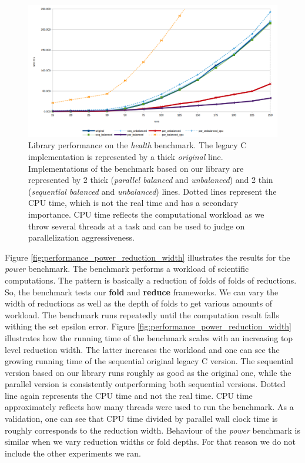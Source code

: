\begin{figure}[!htb]
\includegraphics[width=1.0\textwidth]{images/health_depth_10.png}
\caption{Library performance on the \textit{health} benchmark. The legacy C implementation is represented by a thick \textit{original} line. Implementations of the benchmark based on our library are represented by 2 thick (\textit{parallel balanced} and \textit{unbalanced}) and 2 thin (\textit{sequential balanced} and \textit{unbalanced}) lines. Dotted lines represent the CPU time, which is not the real time and has a secondary importance. CPU time reflects the computational workload as we throw several threads at a task and can be used to judge on parallelization aggressiveness.}
\label{fig:performance_health}
\end{figure}\newline\null
\quad Figure \ref{fig:performance_power_reduction_width} illustrates the results for the \textit{power} benchmark. The benchmark performs a workload of scientific computations. The pattern is basically a reduction of folds of folds of reductions. So, the benchmark tests our \textbf{fold} and \textbf{reduce} frameworks. We can vary the width of reductions as well as the depth of folds to get various amounts of workload. The benchmark runs repeatedly until the computation result falls withing the set epsilon error. Figure \ref{fig:performance_power_reduction_width} illustrates how the running time of the benchmark scales with an increasing top level reduction width. The latter increases the workload and one can see the growing running time of the sequential original legacy C version. The sequential version based on our library runs roughly as good as the original one, while the parallel version is consistently outperforming both sequential versions. Dotted line again represents the CPU time and not the real time. CPU time approximately reflects how many threads were used to run the benchmark. As a validation, one can see that CPU time divided by parallel wall clock time is roughly corresponds to the reduction width. Behaviour of the \textit{power} benchmark is similar when we vary reduction widths or fold depths. For that reason we do not include the other experiments we ran.
